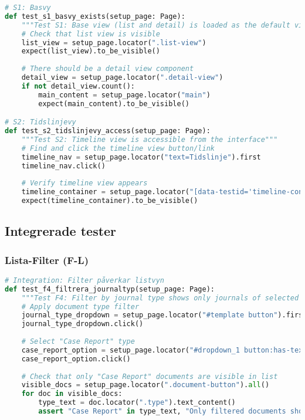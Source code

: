 \begin{lstlisting}[language=python]
# S1: Basvy
def test_s1_basvy_exists(setup_page: Page):
    """Test S1: Base view (list and detail) is loaded as the default view"""
    # Check that list view is visible
    list_view = setup_page.locator(".list-view")
    expect(list_view).to_be_visible()
    
    # There should be a detail view component
    detail_view = setup_page.locator(".detail-view") 
    if not detail_view.count():
        main_content = setup_page.locator("main")
        expect(main_content).to_be_visible()

# S2: Tidslinjevy
def test_s2_tidslinjevy_access(setup_page: Page):
    """Test S2: Timeline view is accessible from the interface"""
    # Find and click the timeline view button/link
    timeline_nav = setup_page.locator("text=Tidslinje").first
    timeline_nav.click()
    
    # Verify timeline view appears
    timeline_container = setup_page.locator("[data-testid='timeline-container']")
    expect(timeline_container).to_be_visible()
\end{lstlisting}

\subsection{Integrerade tester}

\subsubsection{Lista-Filter (F-L)}

\begin{lstlisting}[language=python]
# Integration: Filter påverkar listvyn
def test_f4_filtrera_journaltyp(setup_page: Page):
    """Test F4: Filter by journal type shows only journals of selected type"""
    # Apply document type filter
    journal_type_dropdown = setup_page.locator("#template button").first
    journal_type_dropdown.click()
    
    # Select "Case Report" type
    case_report_option = setup_page.locator("#dropdown_1 button:has-text('Case Report')").first
    case_report_option.click()
    
    # Check that only "Case Report" documents are visible in list
    visible_docs = setup_page.locator(".document-button").all()
    for doc in visible_docs:
        type_text = doc.locator(".type").text_content()
        assert "Case Report" in type_text, "Only filtered documents should be visible"
\end{lstlisting}

